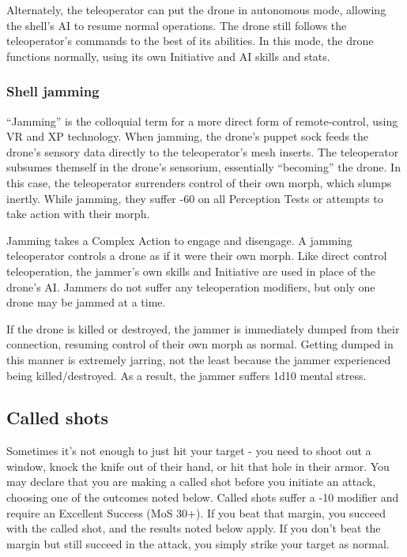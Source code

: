 Alternately, the teleoperator can put the drone in autonomous mode, allowing the shell’s AI to resume normal operations. The drone still follows the teleoperator’s commands to the best of its abilities. In this mode, the drone functions normally, using its own Initiative and AI skills and stats.

\subsubsection{Shell jamming}
``Jamming'' is the colloquial term for a more direct form of remote-control, using VR and XP technology. When jamming, the drone’s puppet sock feeds the drone’s sensory data directly to the teleoperator’s mesh inserts. The teleoperator subsumes themself in the drone’s sensorium, essentially ``becoming'' the drone. In this case, the teleoperator surrenders control of their own morph, which slumps inertly. While jamming, they suffer -60 on all Perception Tests or attempts to take action with their morph.

Jamming takes a Complex Action to engage and disengage. A jamming teleoperator controls a drone as if it were their own morph. Like direct control teleoperation, the jammer’s own skills and Initiative are used in place of the drone’s AI. Jammers do not suffer any teleoperation modifiers, but only one drone may be jammed at a time.

If the drone is killed or destroyed, the jammer is immediately dumped from their connection, resuming control of their own morph as normal. Getting dumped in this manner is extremely jarring, not the least because the jammer experienced being killed/destroyed. As a result, the jammer suffers 1d10 mental stress.


\subsection{Called shots}
\label{sec:called-shots}

Sometimes it’s not enough to just hit your target -  you need to shoot out a window, knock the knife out of their hand, or hit that hole in their armor. You may declare that you are making a called shot before you initiate an attack, choosing one of the outcomes noted below. Called shots suffer a -10 modifier and require an Excellent Success (MoS 30+). If you beat that margin, you succeed with the called shot, and the results noted below apply. If you don’t beat the margin but still succeed in the attack, you simply strike your target as normal.

